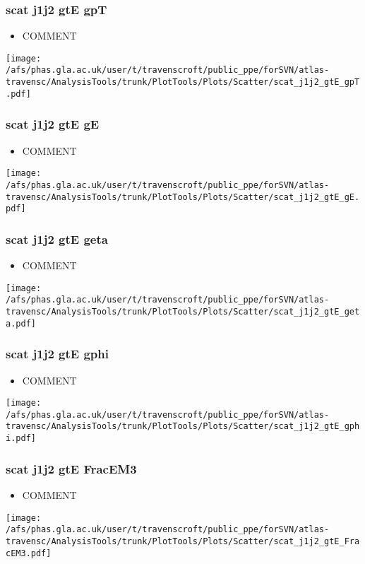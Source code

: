 \documentclass{beamer}
\begin{document}
\begin{frame}
\frametitle{scat j1j2 gtE gpT}
\begin{itemize}
\item COMMENT
\end{itemize}
\begin{center}
\texttt{[image: /afs/phas.gla.ac.uk/user/t/travenscroft/public\_ppe/forSVN/atlas-travensc/AnalysisTools/trunk/PlotTools/Plots/Scatter/scat\_j1j2\_gtE\_gpT.pdf]}
\end{center}
\end{frame}

\begin{frame}
\frametitle{scat j1j2 gtE gE}
\begin{itemize}
\item COMMENT
\end{itemize}
\begin{center}
\texttt{[image: /afs/phas.gla.ac.uk/user/t/travenscroft/public\_ppe/forSVN/atlas-travensc/AnalysisTools/trunk/PlotTools/Plots/Scatter/scat\_j1j2\_gtE\_gE.pdf]}
\end{center}
\end{frame}

\begin{frame}
\frametitle{scat j1j2 gtE geta}
\begin{itemize}
\item COMMENT
\end{itemize}
\begin{center}
\texttt{[image: /afs/phas.gla.ac.uk/user/t/travenscroft/public\_ppe/forSVN/atlas-travensc/AnalysisTools/trunk/PlotTools/Plots/Scatter/scat\_j1j2\_gtE\_geta.pdf]}
\end{center}
\end{frame}

\begin{frame}
\frametitle{scat j1j2 gtE gphi}
\begin{itemize}
\item COMMENT
\end{itemize}
\begin{center}
\texttt{[image: /afs/phas.gla.ac.uk/user/t/travenscroft/public\_ppe/forSVN/atlas-travensc/AnalysisTools/trunk/PlotTools/Plots/Scatter/scat\_j1j2\_gtE\_gphi.pdf]}
\end{center}
\end{frame}

\begin{frame}
\frametitle{scat j1j2 gtE FracEM3}
\begin{itemize}
\item COMMENT
\end{itemize}
\begin{center}
\texttt{[image: /afs/phas.gla.ac.uk/user/t/travenscroft/public\_ppe/forSVN/atlas-travensc/AnalysisTools/trunk/PlotTools/Plots/Scatter/scat\_j1j2\_gtE\_FracEM3.pdf]}
\end{center}
\end{frame}
\end{document}
